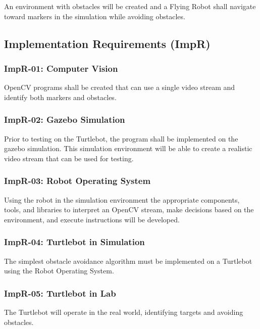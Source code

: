 \documentclass{article}
\begin{document}
		An environment with obstacles will be created and a Flying Robot shall navigate toward markers in the simulation while avoiding obstacles.
		
	
	\subsection{Implementation Requirements (ImpR)}
	
		\subsubsection{ImpR-01: Computer Vision}
		
		OpenCV programs shall be created that can use a single video stream and identify both markers and obstacles.
	
		\subsubsection{ImpR-02: Gazebo Simulation}
		
		Prior to testing on the Turtlebot, the program shall be implemented on the gazebo simulation. This simulation environment will be able to create a realistic video stream that can be used for testing.
		
		\subsubsection{ImpR-03: Robot Operating System}
		
		Using the robot in the simulation environment the appropriate components, tools, and libraries to interpret an OpenCV stream, make decisions based on the environment, and execute instructions will be developed.
		
		\subsubsection{ImpR-04: Turtlebot in Simulation}
		
		The simplest obstacle avoidance algorithm must be implemented on a Turtlebot using the Robot Operating System.
		
		\subsubsection{ImpR-05: Turtlebot in Lab}
		
		The Turtlebot will operate in the real world, identifying targets and avoiding obstacles. 
		
\end{document}
